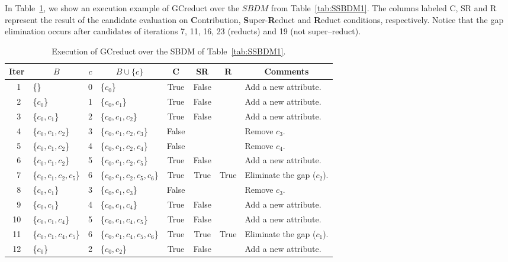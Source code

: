 \documentclass[authoryear,preprint,review,12pt]{elsarticle}
\begin{document}
	In Table~\ref{tab:sample_GCreduct}, we show an execution example of GCreduct over the $SBDM$ from Table~\ref{tab:SSBDM1}.
	The columns labeled C, SR and R represent the result of the candidate evaluation on
	\textbf{C}ontribution, \textbf{S}uper-\textbf{R}educt and \textbf{R}educt conditions, respectively. Notice that
	the gap elimination occurs after candidates of iterations 7, 11, 16, 23 (reducts) and 19 (not super--reduct).
	
	\begin{table}[!htb]
		\caption{Execution of GCreduct over the SBDM of Table~\ref{tab:SSBDM1}.}\label{tab:sample_GCreduct}
      	\centering \scriptsize
    		\begin{tabular}{|c|l|c|l|c|c|c|l|}
    		\hline
    		Iter & \multicolumn{1}{c|}{$B$} & $c$ & \multicolumn{1}{c|}{$B\cup \lbrace c\rbrace$} 
    		& C & SR & R & \multicolumn{1}{c|}{Comments}\\
    		\hline
    		~1 & \{\} 					& 0 & \{$c_0$\} 					& True & False &   & Add a new attribute.\\
    		~2 & \{$c_0$\} 				& 1 & \{$c_0,c_1$\}				& True & False &   & Add a new attribute.\\
    		~3 & \{$c_0,c_1$\} 			& 2 & \{$c_0,c_1,c_2$\}			& True & False &   & Add a new attribute.\\
    		~4 & \{$c_0,c_1,c_2$\} 		& 3 & \{$c_0,c_1,c_2,c_3$\}		& False &   &   & Remove $c_3$.\\
    		~5 & \{$c_0,c_1,c_2$\} 		& 4 & \{$c_0,c_1,c_2,c_4$\}		& False &   &   & Remove $c_4$.\\
    		~6 & \{$c_0,c_1,c_2$\}		& 5 & \{$c_0,c_1,c_2,c_5$\}		& True & False &   & Add a new attribute.\\
    		~7 & \{$c_0,c_1,c_2,c_5$\}	& 6 & \{$c_0,c_1,c_2,c_5,c_6$\} 	& True & True & True & Eliminate the gap ($c_2$).\\
    		~8 & \{$c_0,c_1$\} 			& 3 & \{$c_0,c_1,c_3$\}			& False &   &   & Remove $c_3$.\\
    		~9 & \{$c_0,c_1$\}			& 4 & \{$c_0,c_1,c_4$\}			& True & False &   & Add a new attribute.\\
    		10 & \{$c_0,c_1,c_4$\}		& 5 & \{$c_0,c_1,c_4,c_5$\}		& True & False &   & Add a new attribute.\\
    		11 & \{$c_0,c_1,c_4,c_5$\}	& 6 & \{$c_0,c_1,c_4,c_5,c_6$\} 	& True & True & True & Eliminate the gap ($c_1$).\\
    		12 & \{$c_0$\} 				& 2 & \{$c_0,c_2$\}				& True & False &   & Add a new attribute.\\

\end{tabular}
\end{table}
\end{document}
